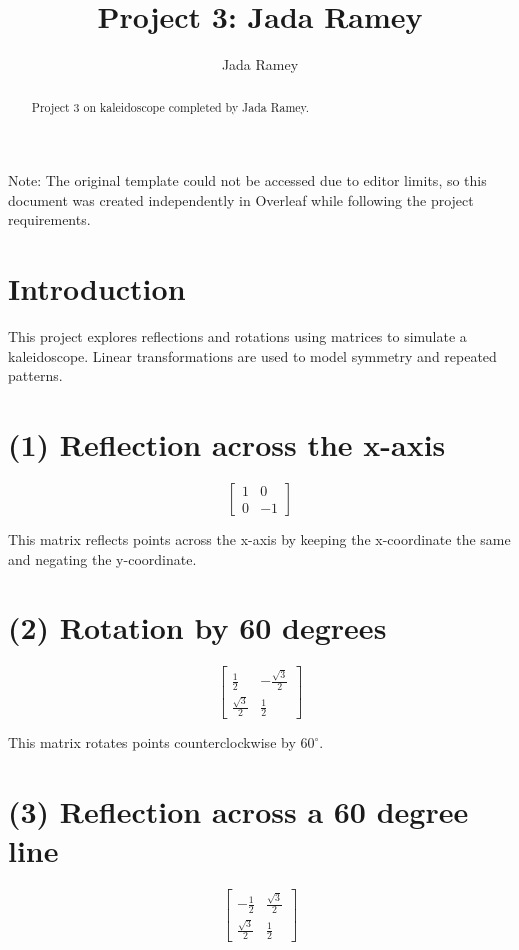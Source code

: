 \documentclass{ximera}
\title{Project 3: Jada Ramey}
\author{Jada Ramey}
\begin{document}
\begin{abstract}
    Project 3 on kaleidoscope completed by Jada Ramey.
\end{abstract}

\maketitle

Note: The original template could not be accessed due to editor limits, so this document was created independently in Overleaf while following the project requirements.

\section*{Introduction}
This project explores reflections and rotations using matrices to simulate a kaleidoscope. Linear transformations are used to model symmetry and repeated patterns.

\section*{(1) Reflection across the x-axis}

\[
\begin{bmatrix}
1 & 0 \\
0 & -1
\end{bmatrix}
\]

This matrix reflects points across the x-axis by keeping the x-coordinate the same and negating the y-coordinate.

\section*{(2) Rotation by 60 degrees}

\[
\begin{bmatrix}
\frac{1}{2} & -\frac{\sqrt{3}}{2} \\
\frac{\sqrt{3}}{2} & \frac{1}{2}
\end{bmatrix}
\]

This matrix rotates points counterclockwise by $60^\circ$.

\section*{(3) Reflection across a 60 degree line}

\[
\begin{bmatrix}
-\frac{1}{2} & \frac{\sqrt{3}}{2} \\
\frac{\sqrt{3}}{2} & \frac{1}{2}
\end{bmatrix}
\]
\end{document}
